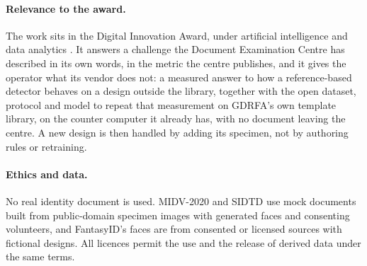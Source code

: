 \documentclass[11pt,a4paper]{article}
\begin{document}
\paragraph{Relevance to the award.} The work sits in the Digital Innovation Award, under artificial intelligence and data analytics \cite{gdrfa2026award}. It answers a challenge the Document Examination Centre has described in its own words, in the metric the centre publishes, and it gives the operator what its vendor does not: a measured answer to how a reference-based detector behaves on a design outside the library, together with the open dataset, protocol and model to repeat that measurement on GDRFA's own template library, on the counter computer it already has, with no document leaving the centre. A new design is then handled by adding its specimen, not by authoring rules or retraining.

\paragraph{Ethics and data.} No real identity document is used. MIDV-2020 and SIDTD use mock documents built from public-domain specimen images with generated faces and consenting volunteers, and FantasyID's faces are from consented or licensed sources with fictional designs. All licences permit the use and the release of derived data under the same terms.



\end{document}
